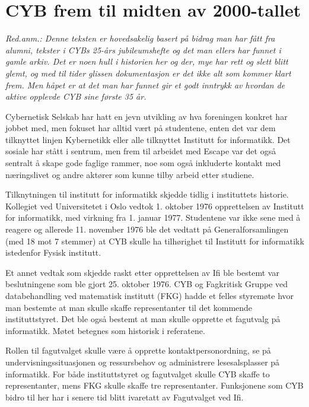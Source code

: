 \chapter[CYB tidlig historie]{CYB frem til midten av 2000-tallet}

\author{Skrevet av Arne Hassel}

\textit{Red.anm.: Denne teksten er hovedsakelig basert på bidrag man har fått fra alumni, tekster i CYBs 25-års jubileumshefte og det man ellers har funnet i gamle arkiv. Det er noen hull i historien her og der, mye har rett og slett blitt glemt, og med til tider glissen dokumentasjon er det ikke alt som kommer klart frem. Men håpet er at det man har funnet gir et godt inntrykk av hvordan de aktive opplevde CYB sine første 35 år.}

Cybernetisk Selskab har hatt en jevn utvikling av hva foreningen konkret har jobbet med, men fokuset har alltid vært på studentene, enten det var dem tilknyttet linjen Kybernetikk eller alle tilknyttet Institutt for informatikk. Det sosiale har stått i sentrum, men frem til arbeidet med Escape var det også sentralt å skape gode faglige rammer, noe som også inkluderte kontakt med næringslivet og andre aktører som kunne tilby arbeid etter studiene. 

Tilknytningen til institutt for informatikk skjedde tidlig i instituttets historie. Kollegiet ved Universitetet i Oslo vedtok 1. oktober 1976 opprettelsen av Institutt for informatikk, med virkning fra 1. januar 1977. Studentene var ikke sene med å reagere og allerede 11. november 1976 ble det vedtatt på Generalforsamlingen (med 18 mot 7 stemmer) at CYB skulle ha tilhørighet til Institutt for informatikk istedenfor Fysisk institutt.

Et annet vedtak som skjedde raskt etter opprettelsen av Ifi ble bestemt var beslutningene som ble gjort 25. oktober 1976. CYB og Fagkritisk Gruppe ved databehandling ved matematisk institutt (FKG) hadde et felles styremøte hvor man bestemte at man skulle skaffe representanter til det kommende instituttstyret. Det ble også bestemt at man skulle opprette et fagutvalg på informatikk. Møtet betegnes som historisk i referatene. 

Rollen til fagutvalget skulle være å opprette kontaktpersonordning, se på undervisningssituasjonen og ressursbehov og administrere lesesalsplasser på informatikk. For både instituttstyret og fagutvalget skulle CYB skaffe to representanter, mens FKG skulle skaffe tre representanter. Funksjonene som CYB bidro til her har i senere tid blitt ivaretatt av Fagutvalget ved Ifi.

